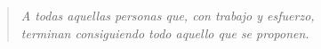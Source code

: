 \begin{verse}
\begin{flushright}
\vspace*{3cm}
\textit{A todas aquellas personas que, con trabajo y esfuerzo,\\ 
terminan consiguiendo todo aquello que se proponen.}
\end{flushright}
\end{verse}
